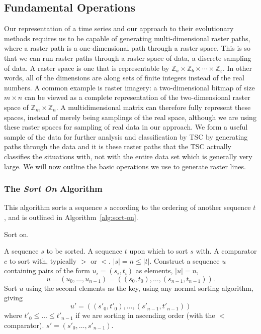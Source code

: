 \subsection{Fundamental Operations}

Our representation of a time series and our approach to their evolutionary methods requires us to be capable of generating multi-dimensional raster paths, where a raster path is a one-dimensional path through a raster space.
This is so that we can run raster paths through a raster space of data, a discrete sampling of data.
A raster space is one that is representable by
$\mathbb{Z}_a \times \mathbb{Z}_b \times \cdots \times \mathbb{Z}_z$.
In other words, all of the dimensions are along sets of finite integers instead of the real numbers.
A common example is raster imagery: a two-dimensional bitmap of size $m \times n$ can be viewed as a complete representation of the two-dimensional raster space of $\mathbb{Z}_m \times \mathbb{Z}_n$.
A multidimensional matrix can therefore fully represent these spaces, instead of merely being samplings of the real space, although we are using these raster spaces for sampling of real data in our approach.
We form a useful sample of the data for further analysis and classification by TSC by generating paths through the data and it is these raster paths that the TSC actually classifies the situations with, not with the entire data set which is generally very large.
We will now outline the basic operations we use to generate raster lines.

\subsubsection{The \emph{Sort On} Algorithm}
This algorithm sorts a sequence $s$ according to the ordering of another sequence $t$, and is outlined in Algorithm~\ref{alg:sort-on}.
\begin{algorithm}[H]
\caption{Sort on.}
\label{alg:sort-on}
\begin{algorithmic}[1]
\INPUT A sequence $s$ to be sorted.
\INPUT A sequence $t$ upon which to sort $s$ with.
\INPUT A comparator $c$ to sort with, typically $>$ or $<$.
\REQUIRE $|s| = n \le |t|$.
\STATE Construct a sequence $u$ containing pairs of the form $u_i = (s_i, t_i)$ as elements, $|u| = n$,
  \begin{equation}
  u = (u_0, \ldots, u_{n-1})
    = \left( (s_0, t_0), \ldots, (s_{n-1}, t_{n-1}) \right).
  \end{equation}
\STATE Sort $u$ using the second elements as the key, using any normal sorting algorithm, giving
  \begin{equation}
  u' = \left( (s'_0, t'_0), \ldots, (s'_{n-1}, t'_{n-1}) \right)
  \end{equation}
  where $t'_0 \le \ldots \le t'_{n-1}$ if we are sorting in ascending order (with the $<$ comparator).
\RETURN $s' = \left( s'_0, \ldots, s'_{n-1} \right)$.
\end{algorithmic}
\end{algorithm}

